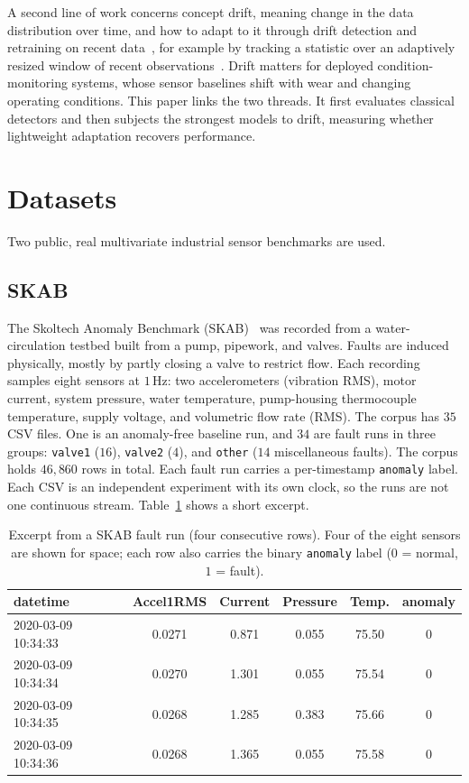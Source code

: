 \documentclass[runningheads]{llncs}
\begin{document}
A second line of work concerns concept drift, meaning change in the data
distribution over time, and how to adapt to it through drift detection and
retraining on recent data~\cite{gama2014}, for example by tracking a statistic
over an adaptively resized window of recent observations~\cite{bifet2007}. Drift
matters for deployed
condition-monitoring systems, whose sensor baselines shift with wear and changing
operating conditions. This paper links the two threads. It first evaluates
classical detectors and then subjects the strongest models to drift, measuring
whether lightweight adaptation recovers performance.

\section{Datasets}
\label{sec:datasets}
Two public, real multivariate industrial sensor benchmarks are used.

\subsection{SKAB}
The Skoltech Anomaly Benchmark (SKAB)~\cite{skab2020} was recorded from a
water-circulation testbed built from a pump, pipework, and valves. Faults are
induced physically, mostly by partly closing a valve to restrict flow. Each
recording samples eight sensors at $1$\,Hz: two accelerometers (vibration RMS),
motor current, system pressure, water temperature, pump-housing thermocouple
temperature, supply voltage, and volumetric flow rate (RMS). The corpus has $35$
CSV files. One is an anomaly-free baseline run, and $34$ are fault runs in three
groups: \texttt{valve1} ($16$), \texttt{valve2} ($4$), and \texttt{other} ($14$
miscellaneous faults). The corpus holds $46{,}860$ rows in total. Each fault run
carries a per-timestamp \texttt{anomaly} label. Each CSV is an independent
experiment with its own clock, so the runs are not one continuous stream.
Table~\ref{tab:skabhead} shows a short excerpt.

\begin{table}[htbp]
\centering
\caption{Excerpt from a SKAB fault run (four consecutive rows). Four of the eight
sensors are shown for space; each row also carries the binary \texttt{anomaly}
label ($0$ = normal, $1$ = fault).}
\label{tab:skabhead}
\setlength{\tabcolsep}{4pt}
\footnotesize
\begin{tabular}{lccccc}
\toprule
datetime & Accel1RMS & Current & Pressure & Temp. & anomaly \\
\midrule
2020-03-09 10:34:33 & 0.0271 & 0.871 & 0.055 & 75.50 & 0 \\
2020-03-09 10:34:34 & 0.0270 & 1.301 & 0.055 & 75.54 & 0 \\
2020-03-09 10:34:35 & 0.0268 & 1.285 & 0.383 & 75.66 & 0 \\
2020-03-09 10:34:36 & 0.0268 & 1.365 & 0.055 & 75.58 & 0 \\
\bottomrule
\end{tabular}
\end{table}
\end{document}
